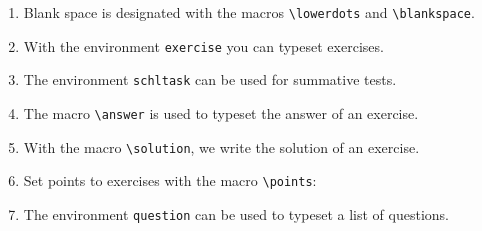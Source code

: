 \documentclass[12pt,a4page]{article}
\def\cellwidth{0.4\textwidth}
\newcommand{\miniexample}[3][t]{%
  \parbox[#1][#3][t]{\cellwidth}{#2}
}
\newcommand{\codeexample}[3][c]{%
  \colorbox[HTML]{b0c4be}{\miniexample[#1]{}{#3}}
}
\newcommand{\textexample}[3][c]{%
  {\footnotesize
    \colorbox[gray]{0.9}{\miniexample[#1]{}{#3}}%
  }
}
\newcommand{\examplerow}[3][10pt]{%
  \par\noindent\strut\hfill\codeexample{#2}{#3}\hspace{#1}\textexample{#2}{#3}\hfill\strut
}
\newlength{\exheight}
\begin{document}
\begin{enumerate}
\item Blank space is designated with the macros \verb|\lowerdots| and \verb|\blankspace|.
  \setlength{\exheight}{18pt}
  \lstset{
    aboveskip=1pt
  }
  \examplerow{exampleMacroBlankspace01.tex}{\exheight}
  \setlength{\exheight}{19pt}
  \examplerow{exampleMacroBlankspace02.tex}{\exheight}
  \setlength{\exheight}{19pt}
  \examplerow{exampleMacroBlankspace03.tex}{\exheight}
  \setlength{\exheight}{28pt}
  \examplerow{exampleMacroBlankspace04.tex}{\exheight}

\item With the environment \texttt{exercise} you can typeset exercises.
  \setlength{\exheight}{186pt}
  \examplerow{exampleEnvirExercise.tex}{\exheight}
\item The environment \texttt{schltask} can be used for summative tests.
  \setlength{\exheight}{78pt}
  \examplerow{exampleEnvirSchltask.tex}{\exheight}
\item The macro \verb/\answer/ is used to typeset the answer of an exercise.
  \setlength{\exheight}{40pt}
  \examplerow{exampleMacroAnswer.tex}{\exheight}
\item With the macro \verb|\solution|, we write the solution of an exercise.
  \setlength{\exheight}{88pt}
  \examplerow{exampleMacroSolution.tex}{\exheight}
\item Set points to exercises with the macro \verb|\points|:
  \setlength{\exheight}{162pt}
  \examplerow{exampleMacroPoints.tex}{\exheight}
\item The environment \verb|question| can be used to typeset a list of questions.

\end{enumerate}
\end{document}
